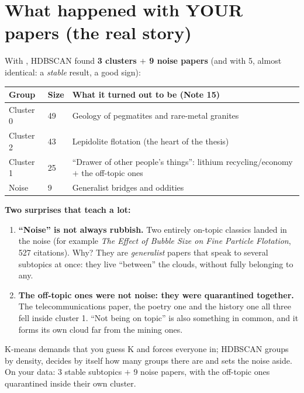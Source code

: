 \documentclass[11pt,a4paper]{article}
\begin{document}
\section{What happened with YOUR papers (the real story)}

With , HDBSCAN found \textbf{3 clusters $+$ 9 noise papers}
(and with 5, almost identical: a \emph{stable} result, a good sign):

\begin{center}
\begin{tabular}{llp{6.6cm}}
\textbf{Group} & \textbf{Size} & \textbf{What it turned out to be (Note 15)} \\
\hline
Cluster 0 & 49 & Geology of pegmatites and rare-metal granites \\
Cluster 2 & 43 & Lepidolite flotation (the heart of the thesis) \\
Cluster 1 & 25 & ``Drawer of other people's things'': lithium recycling/economy $+$ the off-topic ones \\
Noise & 9 & Generalist bridges and oddities \\
\end{tabular}
\end{center}

\begin{ojo}
\textbf{Two surprises that teach a lot:}
\begin{enumerate}
  \item \textbf{``Noise'' is not always rubbish.} Two entirely on-topic classics landed in the
        noise (for example \emph{The Effect of Bubble Size on Fine Particle Flotation}, 527
        citations). Why? They are \emph{generalist} papers that speak to several subtopics at
        once: they live ``between'' the clouds, without fully belonging to any.
  \item \textbf{The off-topic ones were not noise: they were quarantined together.} The
        telecommunications paper, the poetry one and the history one all three fell inside
        cluster 1. ``Not being on topic'' is also something in common, and it forms its own
        cloud far from the mining ones.
\end{enumerate}
\end{ojo}

\begin{resumen}
K-means demands that you guess K and forces everyone in; HDBSCAN groups by density, decides by
itself how many groups there are and sets the noise aside. On your data: 3 stable subtopics
$+$ 9 noise papers, with the off-topic ones quarantined inside their own cluster.
\end{resumen}
\end{document}
